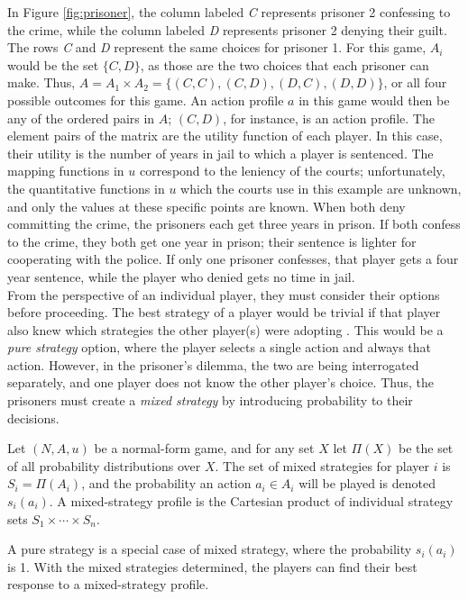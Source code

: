 In Figure \ref{fig:prisoner}, the column labeled \textit{C} represents prisoner 2 confessing to the crime, while the column labeled \textit{D} represents prisoner 2 denying their guilt. The rows \textit{C} and \textit{D} represent the same choices for prisoner 1. For this game, $A_i$ would be the set $\{C, D\}$, as those are the two choices that each prisoner can make. Thus, $A=A_1\times A_2 = \{(C, C), (C, D), (D, C), (D, D)\}$, or all four possible outcomes for this game. An action profile $a$ in this game would then be any of the ordered pairs in $A$; $(C,D)$, for instance, is an action profile. The element pairs of the matrix are the utility function of each player. In this case, their utility is the number of years in jail to which a player is sentenced. The mapping functions in $u$ correspond to the leniency of the courts; unfortunately, the quantitative functions in $u$ which the courts use in this example are unknown, and only the values at these specific points are known. When both deny committing the crime, the prisoners each get three years in prison. If both confess to the crime, they both get one year in prison; their sentence is lighter for cooperating with the police. If only one prisoner confesses, that player gets a four year sentence, while the player who denied gets no time in jail.\\

From the perspective of an individual player, they must consider their options before proceeding. The best strategy of a player would be trivial if that player also knew which strategies the other player(s) were adopting \cite{shoh09}. This would be a \textit{pure strategy} option, where the player selects a single action and always that action. However, in the prisoner's dilemma, the two are being interrogated separately, and one player does not know the other player's choice. Thus, the prisoners must create a \textit{mixed strategy} by introducing probability to their decisions.

\begin{define}
  Let $(N,A,u)$ be a normal-form game, and for any set $X$ let $\Pi(X)$ be the set of all probability distributions over $X$. The set of mixed strategies for player $i$ is $S_i = \Pi(A_i)$, and the probability an action $a_i\in A_i$ will be played is denoted $s_i(a_i)$. A mixed-strategy profile is the Cartesian product of individual strategy sets $S_1\times\cdots\times S_n$.
\end{define}

A pure strategy is a special case of mixed strategy, where the probability $s_i(a_i)$ is 1. With the mixed strategies determined, the players can find their best response to a mixed-strategy profile.

